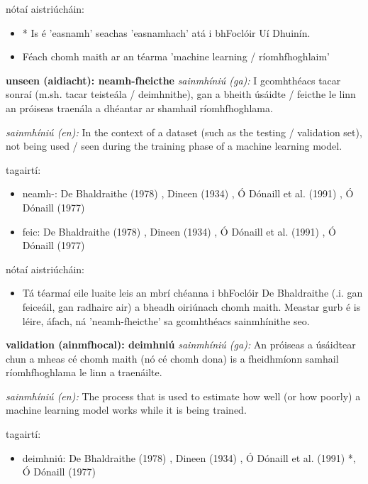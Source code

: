 \documentclass{article}
\begin{document}
nótaí aistriúcháin:
\begin{itemize}
	\item * Is é 'easnamh' seachas 'easnamhach' atá i bhFoclóir Uí Dhuinín.
	\item Féach chomh maith ar an téarma 'machine learning / ríomhfhoghlaim'
\end{itemize}


\textbf{unseen (aidiacht): neamh-fheicthe}
\textit{sainmhíniú (ga):} I gcomhthéacs tacar sonraí (m.sh. tacar teisteála / deimhnithe), gan a bheith úsáidte / feicthe le linn an próiseas traenála a dhéantar ar shamhail ríomhfhoghlama.

\textit{sainmhíniú (en):} In the context of a dataset (such as the testing / validation set), not being used / seen during the training phase of a machine learning model.

tagairtí:
\begin{itemize}
	\item neamh-: De Bhaldraithe (1978) \cite{de-bhaldraithe}, Dineen (1934) \cite{dineen}, Ó Dónaill et al. (1991) \cite{focloir-beag}, Ó Dónaill (1977) \cite{odonaill}
	\item feic: De Bhaldraithe (1978) \cite{de-bhaldraithe}, Dineen (1934) \cite{dineen}, Ó Dónaill et al. (1991) \cite{focloir-beag}, Ó Dónaill (1977) \cite{odonaill}
\end{itemize}

nótaí aistriúcháin:
\begin{itemize}
	\item Tá téarmaí eile luaite leis an mbrí chéanna i bhFoclóir De Bhaldraithe (.i. gan feiceáil, gan radhairc air) a bheadh oiriúnach chomh maith. Meastar gurb é is léire, áfach, ná 'neamh-fheicthe' sa gcomhthéacs sainmhínithe seo.
\end{itemize}


\textbf{validation (ainmfhocal): deimhniú}
\textit{sainmhíniú (ga):} An próiseas a úsáidtear chun a mheas cé chomh maith (nó cé chomh dona) is a fheidhmíonn samhail ríomhfhoghlama le linn a traenáilte.

\textit{sainmhíniú (en):} The process that is used to estimate how well (or how poorly) a machine learning model works while it is being trained.

tagairtí:
\begin{itemize}
	\item deimhniú: De Bhaldraithe (1978) \cite{de-bhaldraithe}, Dineen (1934) \cite{dineen}, Ó Dónaill et al. (1991) \cite{focloir-beag}*, Ó Dónaill (1977) \cite{odonaill}
\end{itemize}
\end{document}
